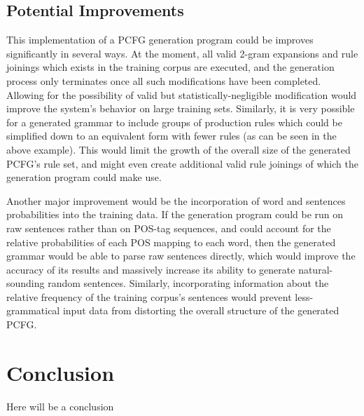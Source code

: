 \documentclass[paper=a4, fontsize=11pt]{scrartcl} %
\numberwithin{equation}{section} %
\numberwithin{figure}{section} %
\numberwithin{table}{section} %
\begin{document}
\subsection{Potential Improvements}

This implementation of a PCFG generation program could be improves significantly in several ways. At the moment, all valid 2-gram expansions and rule joinings which exists in the training corpus are executed, and the generation process only terminates once all such modifications have been completed. Allowing for the possibility of valid but statistically-negligible modification would improve the system's behavior on large training sets. Similarly, it is very possible for a generated grammar to include groups of production rules which could be simplified down to an equivalent form with fewer rules (as can be seen in the above example). This would limit the growth of the overall size of the generated PCFG's rule set, and might even create additional valid rule joinings of which the generation program could make use.

Another major improvement would be the incorporation of word and sentences probabilities into the training data. If the generation program could be run on raw sentences rather than on POS-tag sequences, and could account for the relative probabilities of each POS mapping to each word, then the generated grammar would be able to parse raw sentences directly, which would improve the accuracy of its results and massively increase its ability to generate natural-sounding random sentences. Similarly, incorporating information about the relative frequency of the training corpus's sentences would prevent less-grammatical input data from distorting the overall structure of the generated PCFG.

\section{Conclusion}

Here will be a conclusion
\end{document}
